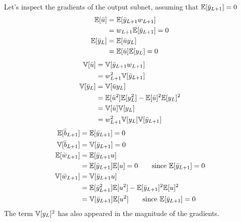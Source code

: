 Let's inspect the gradients of the output subnet, assuming that $\mathbb{E}[\bar{y}_{L+1}] = 0$
\begin{align}
\mathbb{E}[\bar{u}]
& = \mathbb{E}[\bar{y}_{L+1} w_{L+1}] \\
& = w_{L+1} \mathbb{E}[\bar{y}_{L+1}] = 0 \\
\mathbb{E}[\bar{y}_{L}] & = \mathbb{E}[\bar{u} y_{L}] \\
& = \mathbb{E}[\bar{u}] \mathbb{E}[y_{L}] = 0
\end{align}
\begin{align}
\mathbb{V}[\bar{u}]
& = \mathbb{V}[\bar{y}_{L+1} w_{L+1}] \\
& = w_{L+1}^2 \mathbb{V}[\bar{y}_{L+1}] \\
\mathbb{V}[\bar{y}_{L}]
& = \mathbb{V}[\bar{u} y_{L}] \\
& = \mathbb{E}[\bar{u}^2] \mathbb{E}[y_{L}^2] - \mathbb{E}[\bar{u}]^2 \mathbb{E}[y_{L}]^2 \\
& = \mathbb{V}[\bar{u}] \mathbb{V}[y_{L}] \\
& = w_{L+1}^2 \mathbb{V}[y_{L}] \mathbb{V}[\bar{y}_{L+1}]
\end{align}
\begin{align}
\mathbb{E}[\bar{b}_{L+1}] & = \mathbb{E}[\bar{y}_{L+1}] = 0 \\
\mathbb{V}[\bar{b}_{L+1}] & = \mathbb{V}[\bar{y}_{L+1}] = 0 \\
\mathbb{E}[\bar{w}_{L+1}]
& = \mathbb{E}[\bar{y}_{L+1} u] \\
& = \mathbb{E}[\bar{y}_{L+1}] \mathbb{E}[u] = 0 \qquad \text{since $\mathbb{E}[\bar{y}_{L+1}] = 0$} \\
\mathbb{V}[\bar{w}_{L+1}]
& = \mathbb{V}[\bar{y}_{L+1} u] \\
& = \mathbb{E}[\bar{y}_{L+1}^2] \mathbb{E}[u^2] - \mathbb{E}[\bar{y}_{L+1}]^2 \mathbb{E}[u]^2 \\
& = \mathbb{V}[\bar{y}_{L+1}] \mathbb{E}[u^2] \qquad \text{since $\mathbb{E}[\bar{y}_{L+1}] = 0$}
\end{align}
The term $\mathbb{V}[y_{L}]^2$ has also appeared in the magnitude of the gradients.


